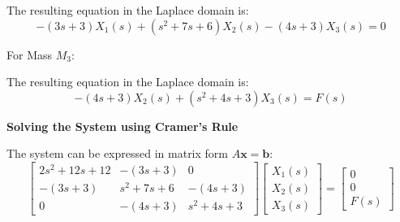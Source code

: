 \documentclass[11pt]{article}
\begin{document}
The resulting equation in the Laplace domain is:
\begin{equation}
-(3s + 3)X_1(s) + (s^2 + 7s + 6)X_2(s) - (4s + 3)X_3(s) = 0 \tag{2}
\end{equation}

\newpage

\vspace{12pt}
{For Mass $M_3$:}
\begin{figure}[h!]
\centering
{}
\end{figure}

The resulting equation in the Laplace domain is:
\begin{equation}
-(4s + 3)X_2(s) + (s^2 + 4s + 3)X_3(s) = F(s) \tag{3}
\end{equation}

\noindent\textbf{Solving the System using Cramer's Rule}
\vspace{12pt}

The system can be expressed in matrix form $A\mathbf{x} = \mathbf{b}$:
$$
\begin{bmatrix}
2s^2 + 12s + 12 & -(3s + 3) & 0 \\
-(3s + 3) & s^2 + 7s + 6 & -(4s + 3) \\
0 & -(4s + 3) & s^2 + 4s + 3
\end{bmatrix}
\begin{bmatrix}
X_1(s) \\
X_2(s) \\
X_3(s)
\end{bmatrix}
=
\begin{bmatrix}
0 \\
0 \\
F(s)
\end{bmatrix}
$$
\end{document}
